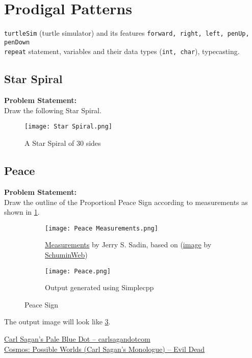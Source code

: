 \section{Prodigal Patterns}{\label{sec:prodigalpatterns}}
\begin{topics}
\verb!turtleSim! (turtle simulator) and its features \verb!forward, right, left, penUp, penDown!\\
\verb!repeat! statement, variables and their data types (\verb!int, char!), typecasting.
\end{topics}
\subsection{Star Spiral}{\label{pp:starspiral}}
\textbf{Problem Statement:}\\
Draw the following Star Spiral.
\begin{figure}[H]
	\centering
	\texttt{[image: Star Spiral.png]}
	\caption{A Star Spiral of 30 sides}
\end{figure}
\subsection{Peace}{\label{pp:peace}}
\textbf{Problem Statement:}\\
Draw the outline of the Proportionl Peace Sign according to measurements as shown in \ref{fig:peacemeasurements}.
\begin{figure}[H]
\centering
	\begin{subfigure}{\linewidth}
	\centering
	\texttt{[image: Peace Measurements.png]}
	\caption{\href{https://bit.ly/peace-sign-measurements}{Measurements} by Jerry S. Sadin, based on (\href{https://bit.ly/peace-sign-wikipedia}{image} by \href{https://commons.wikimedia.org/wiki/User:SchuminWeb}{SchuminWeb})}
	\label{fig:peacemeasurements}
\end{subfigure}
\begin{subfigure}{\linewidth}
	\centering
	\texttt{[image: Peace.png]}
	\caption{Output generated using Simplecpp}
	\label{fig:peace}
\end{subfigure}
\caption{Peace Sign}
\end{figure}
The output image will look like \ref{fig:peace}.
\begin{funvideo}
\href{https://youtu.be/GO5FwsblpT8}{Carl Sagan's Pale Blue Dot -- carlsagandotcom}\\
\href{https://youtu.be/lshWT0iyxds}{Cosmos: Possible Worlds (Carl Sagan's Monologue) -- Evil Dead}
\end{funvideo}

